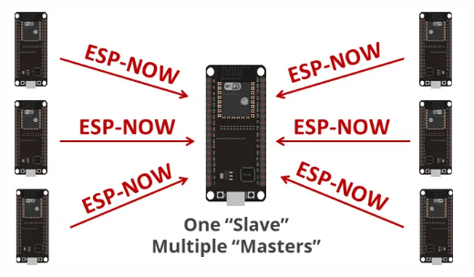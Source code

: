 \documentclass[a4paper ,12pt, onecolumn]{article}
\begin{document}
\begin{enumerate}
                \paragraph{}
                \includegraphics[scale=0.5]{espnow.png}
            \end{enumerate}
\end{document}
